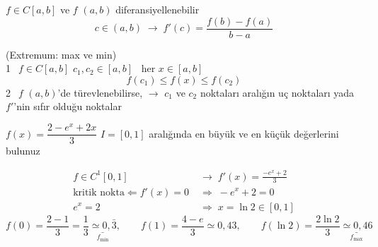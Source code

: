 \documentclass[11pt,a4paper]{article}
\begin{document}
\noindent
\begin{minipage}[c]{0.6\linewidth}
\begin{teorem}
$f \in C[a,b]$ ve $f$ $(a,b)$ diferansiyellenebilir
\[
  c \in (a,b) \;\rightarrow\; f'(c) = \frac{f(b) - f(a)}{b - a}
\]
\end{teorem}
\end{minipage}\hfill
\begin{minipage}[c]{0.36\linewidth}
\centering
{}
\end{minipage}

\begin{teorem}
{\small (Extremum: max ve min)}\\
\textcircled{\small 1}\ $f \in C[a,b]$ \qquad $c_1, c_2 \in [a,b]$ \ her $x \in [a,b]$
\[
  f(c_1) \le f(x) \le f(c_2)
\]
\textcircled{\small 2}\ $f$ $(a,b)$'de türevlenebilirse, $\rightarrow$ $c_1$ ve $c_2$ noktaları aralığın uç noktaları
yada $f'$'nin sıfır olduğu noktalar
\end{teorem}

\begin{ornek}[2]
$f(x) = \dfrac{2 - e^x + 2x}{3}$ \quad $I = [0,1]$ aralığında en büyük ve en küçük değerlerini bulunuz
\end{ornek}
\begin{cozum}
\begin{align*}
  f \in C^1[0,1] \;&\rightarrow\; f'(x) = \frac{-e^x + 2}{3}\\
  \text{kritik nokta} \Leftarrow f'(x) = 0 \;&\Rightarrow\; -e^x + 2 = 0\\
  e^x = 2 \;&\Rightarrow\; \boxed{x = \ln 2} \in [0,1]
\end{align*}
\[
  f(0) = \frac{2-1}{3} = \frac{1}{3} \underset{f_{\min}}{\underline{\simeq 0{,}\bar{3}}}, \qquad
  f(1) = \frac{4-e}{3} \simeq 0{,}43, \qquad
  f(\ln 2) = \frac{2\ln 2}{3} \underset{f_{\max}}{\underline{\simeq 0{,}46}}
\]
\end{cozum}
\end{document}
